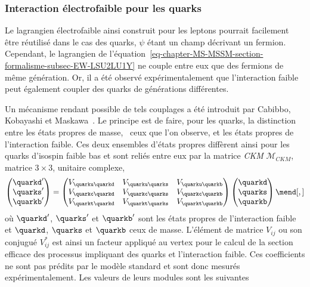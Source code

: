 \subsubsection{Interaction électrofaible pour les quarks}\label{chapter-MS-MSSM-section-formalisme-subsec-EW-quarks}
Le lagrangien électrofaible ainsi construit pour les leptons pourrait facilement être réutilisé dans le cas des quarks, $\psi$ étant un champ décrivant un fermion. Cependant, le lagrangien de l'équation~\eqref{eq-chapter-MS-MSSM-section-formalisme-subsec-EW-LSU2LU1Y} ne couple entre eux que des fermions de même génération. Or, il a été observé expérimentalement que l'interaction faible peut également coupler des quarks de générations différentes.
\par Un mécanisme rendant possible de tels couplages a été introduit par Cabibbo, Kobayashi et Maskawa~. Le principe est de faire, pour les quarks, la distinction entre les états propres de masse, \ie\ ceux que l'on observe, et les états propres de l'interaction faible. Ces deux ensembles d'états propres diffèrent ainsi pour les quarks d'isospin faible bas et sont reliés entre eux par la matrice \emph{CKM} $\mathcal{M}_{CKM}$, matrice $3\times3$, unitaire complexe,
\begin{equation}
\begin{pmatrix}
\quarkd' \\ \quarks' \\ \quarkb'
\end{pmatrix}
=
\begin{pmatrix}
V_{\quarku\quarkd} & V_{\quarku\quarks} & V_{\quarku\quarkb} \\
V_{\quarkc\quarkd} & V_{\quarkc\quarks} & V_{\quarkc\quarkb} \\
V_{\quarkt\quarkd} & V_{\quarkt\quarks} & V_{\quarkt\quarkb}
\end{pmatrix}
\begin{pmatrix}
\quarkd \\ \quarks \\ \quarkb
\end{pmatrix}
\mend[,]
\end{equation}
où $\quarkd'$, $\quarks'$ et $\quarkb'$ sont les états propres de l'interaction faible et $\quarkd$, $\quarks$ et $\quarkb$ ceux de masse. L'élément de matrice $V_{ij}$ ou son conjugué $V_{ij}^*$ est ainsi un facteur appliqué au vertex pour le calcul de la section efficace des processus impliquant des quarks et l'interaction faible. Ces coefficients ne sont pas prédits par le modèle standard et sont donc mesurés expérimentalement. Les valeurs de leurs modules sont les suivantes~\cite{PDG_booklet_2018}
